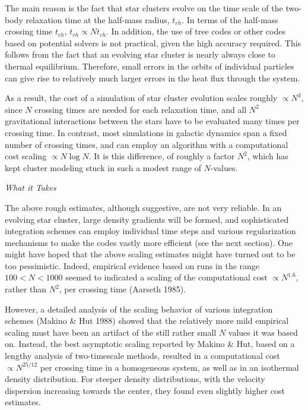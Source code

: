 The main reason is the fact that star clusters evolve on the time
scale of the two-body relaxation time at the half-mass radius,
$t_{rh}$.  In terms of the half-mass crossing time $t_{ch}$, $t_{rh}
\propto N t_{ch}$.  In addition, the use of tree codes or other codes
based on potential solvers is not practical, given the high accuracy
required.  This follows from the fact that an evolving star cluster is
nearly always close to thermal equilibrium.  Therefore, small errors
in the orbits of individual particles can give rise to relatively much
larger errors in the heat flux through the system.

As a result, the cost of a simulation of star cluster evolution scales
roughly $\propto N^3$, since $N$ crossing times are needed for each
relaxation time, and all $N^2$ gravitational interactions between the
stars have to be evaluated many times per crossing time.  In contrast,
most simulations in galactic dynamics span a fixed number of crossing
times, and can employ an algorithm with a computational cost scaling
$\propto N\log N$.  It is this difference, of roughly a factor $N^2$,
which has kept cluster modeling stuck in such a modest range of
$N$-values.

\bigskip
\noindent
{\it What it Takes}
\medskip

The above rough estimates, although suggestive, are not very reliable.
In an evolving star cluster, large density gradients will be formed,
and sophisticated integration schemes can employ individual time steps
and various regularization mechanisms to make the codes vastly more
efficient (see the next section).  One might have hoped that the above
scaling estimates might have turned out to be too pessimistic.
Indeed, empirical evidence based on runs in the range $100 < N < 1000$
seemed to indicated a scaling of the computational cost $\propto
N^{1.6}$, rather than $N^2$, per crossing time (Aarseth 1985).

However, a detailed analysis of the scaling behavior of various
integration schemes (Makino \& Hut 1988) showed that the relatively
more mild empirical scaling must have been an artifact of the still
rather small $N$ values it was based on.  Instead, the best asymptotic
scaling reported by Makino \& Hut, based on a lengthy analysis of
two-timescale methods, resulted in a computational cost $\propto
N^{25/12}$ per crossing time in a homogeneous system, as well as in an
isothermal density distribution.  For steeper density distributions,
with the velocity dispersion increasing towards the center, they found
even slightly higher cost estimates.

